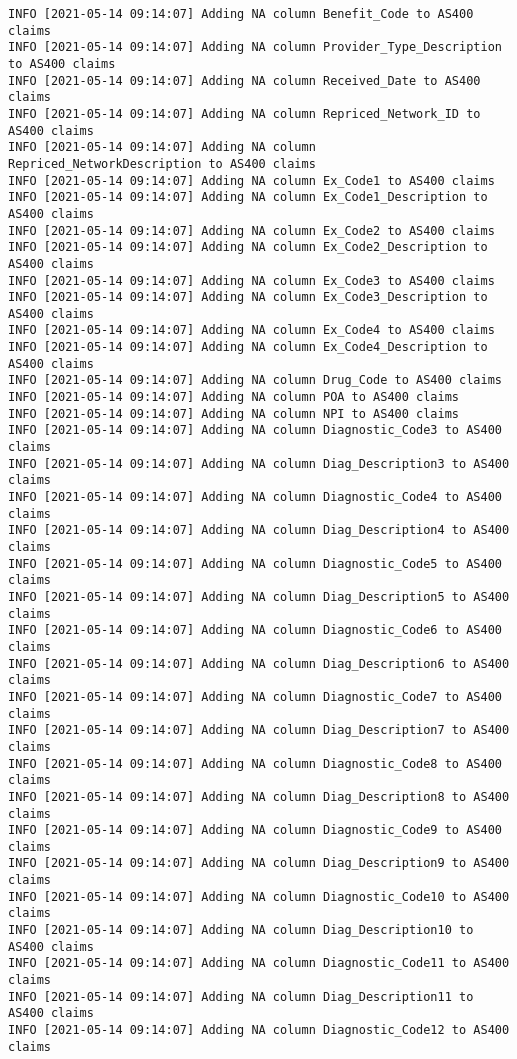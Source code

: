 \documentclass[
]{book}
\begin{document}
\begin{verbatim}
INFO [2021-05-14 09:14:07] Adding NA column Benefit_Code to AS400 claims
INFO [2021-05-14 09:14:07] Adding NA column Provider_Type_Description to AS400 claims
INFO [2021-05-14 09:14:07] Adding NA column Received_Date to AS400 claims
INFO [2021-05-14 09:14:07] Adding NA column Repriced_Network_ID to AS400 claims
INFO [2021-05-14 09:14:07] Adding NA column Repriced_NetworkDescription to AS400 claims
INFO [2021-05-14 09:14:07] Adding NA column Ex_Code1 to AS400 claims
INFO [2021-05-14 09:14:07] Adding NA column Ex_Code1_Description to AS400 claims
INFO [2021-05-14 09:14:07] Adding NA column Ex_Code2 to AS400 claims
INFO [2021-05-14 09:14:07] Adding NA column Ex_Code2_Description to AS400 claims
INFO [2021-05-14 09:14:07] Adding NA column Ex_Code3 to AS400 claims
INFO [2021-05-14 09:14:07] Adding NA column Ex_Code3_Description to AS400 claims
INFO [2021-05-14 09:14:07] Adding NA column Ex_Code4 to AS400 claims
INFO [2021-05-14 09:14:07] Adding NA column Ex_Code4_Description to AS400 claims
INFO [2021-05-14 09:14:07] Adding NA column Drug_Code to AS400 claims
INFO [2021-05-14 09:14:07] Adding NA column POA to AS400 claims
INFO [2021-05-14 09:14:07] Adding NA column NPI to AS400 claims
INFO [2021-05-14 09:14:07] Adding NA column Diagnostic_Code3 to AS400 claims
INFO [2021-05-14 09:14:07] Adding NA column Diag_Description3 to AS400 claims
INFO [2021-05-14 09:14:07] Adding NA column Diagnostic_Code4 to AS400 claims
INFO [2021-05-14 09:14:07] Adding NA column Diag_Description4 to AS400 claims
INFO [2021-05-14 09:14:07] Adding NA column Diagnostic_Code5 to AS400 claims
INFO [2021-05-14 09:14:07] Adding NA column Diag_Description5 to AS400 claims
INFO [2021-05-14 09:14:07] Adding NA column Diagnostic_Code6 to AS400 claims
INFO [2021-05-14 09:14:07] Adding NA column Diag_Description6 to AS400 claims
INFO [2021-05-14 09:14:07] Adding NA column Diagnostic_Code7 to AS400 claims
INFO [2021-05-14 09:14:07] Adding NA column Diag_Description7 to AS400 claims
INFO [2021-05-14 09:14:07] Adding NA column Diagnostic_Code8 to AS400 claims
INFO [2021-05-14 09:14:07] Adding NA column Diag_Description8 to AS400 claims
INFO [2021-05-14 09:14:07] Adding NA column Diagnostic_Code9 to AS400 claims
INFO [2021-05-14 09:14:07] Adding NA column Diag_Description9 to AS400 claims
INFO [2021-05-14 09:14:07] Adding NA column Diagnostic_Code10 to AS400 claims
INFO [2021-05-14 09:14:07] Adding NA column Diag_Description10 to AS400 claims
INFO [2021-05-14 09:14:07] Adding NA column Diagnostic_Code11 to AS400 claims
INFO [2021-05-14 09:14:07] Adding NA column Diag_Description11 to AS400 claims
INFO [2021-05-14 09:14:07] Adding NA column Diagnostic_Code12 to AS400 claims

\end{verbatim}
\end{document}
